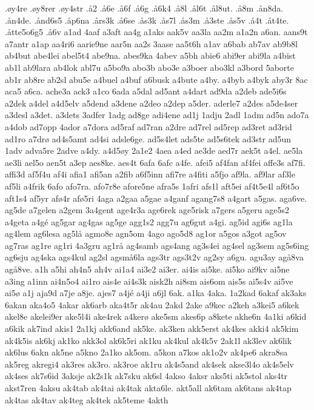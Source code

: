 {.øy4re
.øy8rer
.øy4str
.å2
.å6e
.å6f
.å6g
.å6k4
.å8l
.ål6t
.ål8ut.
.å8m
.ån8da.
.ån4de.
.ånd6s5
.åp6na
.års3k
.å6se
.ås3k
.ås7l
.ås3m
.å3ste
.ås5v
.å4t
.åt4te.
.åtte5o6g5
.å6v
a1ad
4aaf
a3aft
aa4g
a1aks
aak5v
aa3la
aa2m
a1a2n
a6an.
aans9t
a7antr
a1ap
aa4ri6
aarie9ne
aar5n
aa2s
3aase
aa5t6h
a1av
a6bab
ab7av
ab9b8l
ab4but
abe4lei
abel5t4
abe9na.
abes9ka
4abev
a5bh
abie6
abi9er
abi9la
a4bist
ab1l
ab9lara
ab4lok
abl7u
a5bo9a
abo3b
abo3e
a3boer
abo3kl
a3bord
5aborte
ab1r
ab8re
ab2sl
abu5e
a4buel
a4buf
a6busk
a4bute
a4by.
a4byb
a4byk
aby3r
8ac
aca5
a6ca.
ache3a
ack3
a1co
6ada
a5dal
ad5ant
a4dart
ad9da
a2deb
ade5i6s
a2dek
a4del
a4d5elv
a5dend
a3dene
a2deo
a2dep
a5der.
aderle7
a2des
a5de4ser
a3desl
a3det.
a3dets
3adfer
1adg
ad8ge
adi4ene
ad1j
1adju
2adl
1adm
ad5n
ado7a
a4dob
ad7opp
4ador
a7dora
ad5raf
ad7ran
a2dre
ad7rel
ad5rep
ad3ret
ad3rid
ad1ro
a7drø
ad4s5amt
ad4si
adsle6ge.
ad5s4let
ads5te
ad5s6tek
ad3str
ad5un
1adv
adva5re
2adve
a4dy.
a4d5øy
2a1e2
4aea
a4ed
ae3de
aed7r
aek5t
a4el.
ae5la
ae3li
ael5o
aen5t
a3ep
aes8ke.
aes4t
6afa
6afc
a4fe.
afei5
af4fan
af4fei
affe3s
af7fi.
affi3d
af5f4u
af4i
afia1
afi5an
a2fib
a6f5inn
afi7re
a4fiti
a5fjo
af9la.
af9lar
af3le
af5li
a4frik
6afo
afo7ra.
afo7r8e
afore5ne
afra5s
1afri
afs1l
aft5ei
af4t5e4l
af6t5o
aft1s4
af5yr
afø4r
afø5ri
4aga
a2gaa
a5gae
a4ganf
agang7s8
a4gart
a5gas.
aga6ve.
ag5de
a7gelen
a2gem
3a4gent
age4r3a
age6rek
age5risk
a7gers
a5geru
age5s2
a4geta
a4gé
ag5gar
ag4gas
ag5ge
agg1s2
agg7u
ag6gut
a4gi.
ag5id
agi6s
ag1la
ag4lem
ag6lesa
ag5lå
agmo8e
agn5om
4ago
ago5d8
ag1or
a5gos
a3got
ag5ov
ag7ras
ag1re
ag1ri
4a3gru
ag1rå
ag4samb
ags4ang
ag3s4ei
ag4sel
ag3sem
ag5s6ing
ag6sju
ag4ska
ags4kul
ag2sl
agsmå6la
ags3tr
ags3t2v
ag2sy
a6gu.
agu3ay
agå8va
agå8ve.
a1h
a5hi
ah4n5
ah4v
ai1a4
ai3e2
ai3er.
ai4is
ai5ke.
ai5ko
ai9kv
ai5ne
a3ing
a1inn
ai4n5o4
ai1ro
ais4e
ai4s3k
aisk2h
ai8sm
ais6om
ais5s
ai5s4v
ai5ve
ai5ø
a1j
aja9d
a7je
a8je.
ajes7
a4jé
a4ji
a6jl
6ak.
a1ka
4aka.
1a2kad
6akaf
ak3aks
6akan
aka4o5
4akar
ak6arb
aka4t5r
ak4au
2akd
2ake
a9kec
a2keh
a3kei5
a6kek
akel8e
akelei9er
ake5l4i
ake4rek
a4kerø
ake5sm
akes6p
a8kete
akhe6n
4a1ki
a6kid
a6kik
ak7ind
akis1
2a1kj
akk6and
ak5ke.
ak3ken
akk5erst
ak4kes
akki4
ak5kim
ak4k5is
ak6kj
ak1ko
akk3ol
ak6k5ri
ak1ku
ak4kul
ak4k5v
2ak1l
ak3lev
ak6lik
ak6lus
6akn
ak5ne
a5kno
2a1ko
ak5om.
a5kon
a7kos
ak1o2v
ak4pe6
akra8sa
ak5reg
akregi4
ak3res
ak3ro.
ak3roe
ak1ru
ak4s5and
ak4sek
akse3l4o
ak4s5elv
ak4ses
ak7s6id
3aksje
ak2s1k
ak7sku
ak6sl
4akso
4aksr
aks5ti
ak5stol
aks4tr
akst7ren
4aksu
ak4tab
ak4tai
ak4tak
akta6le.
akt5all
ak6tam
ak6tans
ak4tap
ak4tas
ak4tav
ak4teg
ak4tek
ak5teme
4akth
}
